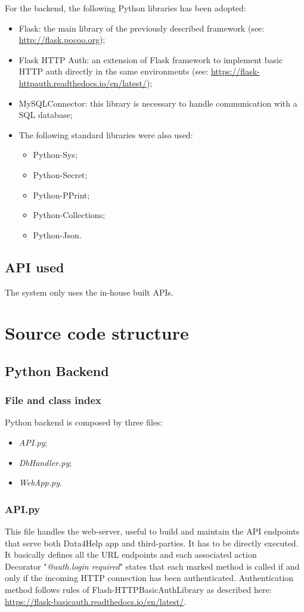 \documentclass{article}
\begin{document}
For the backend, the following Python libraries has been adopted:
\begin{itemize}
	\item Flask: the main library of the previously described framework (see: \url{http://flask.pocoo.org});
	\item Flask HTTP Auth: an extension of Flask framework to implement basic HTTP auth directly in the same environments (see: \url{https://flask-httpauth.readthedocs.io/en/latest/});
	\item MySQLConnector: this library is necessary to handle communication with a SQL database;
	\item The following standard libraries were also used:
			\begin{itemize}
				\item Python-Sys;
				\item Python-Secret;
				\item Python-PPrint;
				\item Python-Collections;
				\item Python-Json.
			\end{itemize}
\end{itemize}

\subsection{API used}
The system only uses the in-house built APIs.

\newpage
\section{Source code structure}
\subsection{Python Backend}
\subsubsection{File and class index}
Python backend is composed by three files:
\begin{itemize}
	\item \textit{API.py};
	\item \textit{DbHandler.py};
	\item \textit{WebApp.py}.
\end{itemize}

\subsubsection{API.py}
 This file handles the web-server, useful to build and maintain the API endpoints that serve both Data4Help app and third-parties. It has to be directly executed. It basically defines all the URL endpoints and each associated action\\
 Decorator "\textit{@auth.login required}" states that each marked method is called if and only if the incoming HTTP connection has been authenticated. Authentication method follows rules of Flash-HTTPBasicAuthLibrary as described here: \url{https://flask-basicauth.readthedocs.io/en/latest/}.
\end{document}
